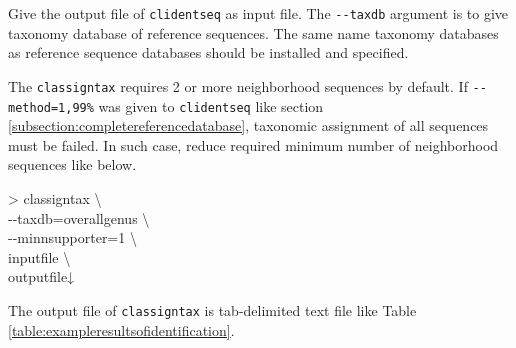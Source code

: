 \documentclass[titlepage,10pt,a4paper,english]{jsbook}
\newenvironment{cmd}{\begin{oframed}\raggedright\ttfamily\footnotesize\setlength{\baselineskip}{1.4em}}{\end{oframed}\vspace{-1em}}
\begin{document}
Give the output file of \texttt{clidentseq} as input file.
The \texttt{{-}{-}taxdb} argument is to give taxonomy database of reference sequences.
The same name taxonomy databases as reference sequence databases should be installed and specified.

The \texttt{classigntax} requires 2 or more neighborhood sequences by default.
If \texttt{{-}{-}method=1,99\%} was given to \texttt{clidentseq} like section \ref{subsection:completereferencedatabase}, taxonomic assignment of all sequences must be failed.
In such case, reduce required minimum number of neighborhood sequences like below.

\begin{cmd}
{\textgreater} classigntax {\textbackslash}\\
{-}{-}taxdb=overall{\textunderscore}genus {\textbackslash}\\
{-}{-}minnsupporter=1 {\textbackslash}\\
inputfile {\textbackslash}\\
outputfile↓
\end{cmd}

The output file of \texttt{classigntax} is tab-delimited text file like Table \ref{table:exampleresultsofidentification}.
\end{document}
